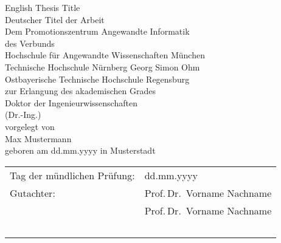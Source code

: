 \begin{titlepage}
\centering
\huge

\vspace*{\fill}
English Thesis Title\\[1cm]
Deutscher Titel der Arbeit
\vspace{3cm}\\

\Large
Dem Promotionszentrum Angewandte Informatik\\
des Verbunds\\[1cm]
Hochschule für Angewandte Wissenschaften München\\
Technische Hochschule Nürnberg Georg Simon Ohm\\
Ostbayerische Technische Hochschule Regensburg\\[1cm]

zur Erlangung des akademischen Grades\\
Doktor der Ingenieurwissenschaften\\
(Dr.-Ing.)\\
\vspace{4cm}
vorgelegt von\\
Max Mustermann\\
\vspace{0.5cm}
geboren am dd.mm.yyyy in Musterstadt
\vspace*{\fill}
\end{titlepage}

\newpage
\thispagestyle{empty}


\vspace*{\fill}

\begin{center}
\begin{tabular}{p{6cm}p{8cm}}
Tag der mündlichen Prüfung: & dd.mm.yyyy \\
Gutachter: & Prof.\,Dr.~Vorname Nachname\\
          & Prof.\,Dr.~Vorname Nachname\\
~\\
\end{tabular}
\end{center}
\vspace*{1cm}
\normalsize
